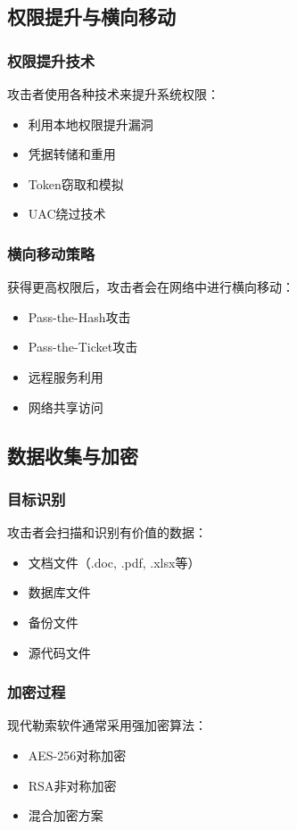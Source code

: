\documentclass[12pt,a4paper]{article}
\begin{document}
\subsection{权限提升与横向移动}

\subsubsection{权限提升技术}
攻击者使用各种技术来提升系统权限：
\begin{itemize}
    \item 利用本地权限提升漏洞
    \item 凭据转储和重用
    \item Token窃取和模拟
    \item UAC绕过技术
\end{itemize}

\subsubsection{横向移动策略}
获得更高权限后，攻击者会在网络中进行横向移动：
\begin{itemize}
    \item Pass-the-Hash攻击
    \item Pass-the-Ticket攻击
    \item 远程服务利用
    \item 网络共享访问
\end{itemize}

\subsection{数据收集与加密}

\subsubsection{目标识别}
攻击者会扫描和识别有价值的数据：
\begin{itemize}
    \item 文档文件（.doc, .pdf, .xlsx等）
    \item 数据库文件
    \item 备份文件
    \item 源代码文件
\end{itemize}

\subsubsection{加密过程}
现代勒索软件通常采用强加密算法：
\begin{itemize}
    \item AES-256对称加密
    \item RSA非对称加密
    \item 混合加密方案
\end{itemize}
\end{document}
